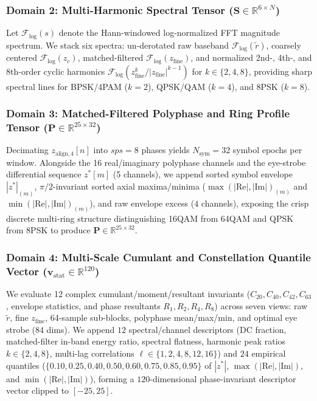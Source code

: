 \subsubsection{Domain 2: Multi-Harmonic Spectral Tensor ($\mathbf{S} \in \mathbb{R}^{6 \times N}$)}
Let $\mathcal{F}_{\log}(s)$ denote the Hann-windowed log-normalized FFT magnitude spectrum. We stack six spectra: un-derotated raw baseband $\mathcal{F}_{\log}(\tilde{r})$, coarsely centered $\mathcal{F}_{\log}(z_c)$, matched-filtered $\mathcal{F}_{\log}(z_{\text{fine}})$, and normalized 2nd-, 4th-, and 8th-order cyclic harmonics $\mathcal{F}_{\log}(z_{\text{fine}}^k / |z_{\text{fine}}|^{k-1})$ for $k \in \{2, 4, 8\}$, providing sharp spectral lines for BPSK/4PAM ($k=2$), QPSK/QAM ($k=4$), and 8PSK ($k=8$).

\subsubsection{Domain 3: Matched-Filtered Polyphase and Ring Profile Tensor ($\mathbf{P} \in \mathbb{R}^{25 \times 32}$)}
Decimating $z_{\text{align},4}[n]$ into $sps=8$ phases yields $N_{\text{sym}} = 32$ symbol epochs per window. Alongside the 16 real/imaginary polyphase channels and the eye-strobe differential sequence $z^*[m]$ (5 channels), we append sorted symbol envelope $|z^*|_{(m)}$, $\pi/2$-invariant sorted axial maxima/minima ($\max(|\text{Re}|, |\text{Im}|)_{(m)}$ and $\min(|\text{Re}|, |\text{Im}|)_{(m)}$), and raw envelope excess ($4$ channels), exposing the crisp discrete multi-ring structure distinguishing 16QAM from 64QAM and QPSK from 8PSK to produce $\mathbf{P} \in \mathbb{R}^{25 \times 32}$.

\subsubsection{Domain 4: Multi-Scale Cumulant and Constellation Quantile Vector ($\mathbf{v}_{\text{stat}} \in \mathbb{R}^{120}$)}
We evaluate 12 complex cumulant/moment/resultant invariants ($C_{20}, C_{40}, C_{42}, C_{63}$, envelope statistics, and phase resultants $R_1, R_2, R_4, R_8$) across seven views: raw $\tilde{r}$, fine $z_{\text{fine}}$, 64-sample sub-blocks, polyphase mean/max/min, and optimal eye strobe ($84$ dims). We append $12$ spectral/channel descriptors (DC fraction, matched-filter in-band energy ratio, spectral flatness, harmonic peak ratios $k \in \{2,4,8\}$, multi-lag correlations $\ell \in \{1,2,4,8,12,16\}$) and $24$ empirical quantiles ($\{0.10, 0.25, 0.40, 0.50, 0.60, 0.75, 0.85, 0.95\}$ of $|z^*|$, $\max(|\text{Re}|, |\text{Im}|)$, and $\min(|\text{Re}|, |\text{Im}|)$), forming a $120$-dimensional phase-invariant descriptor vector clipped to $[-25, 25]$.

